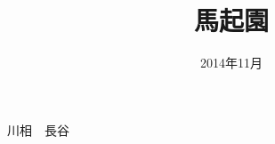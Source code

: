 \documentclass[dvipdfmx]{beamer}
\date{2014年11月}
\title{馬起園}
\begin{document}
\begin{frame}
川相　長谷
\end{frame}
\end{document}
